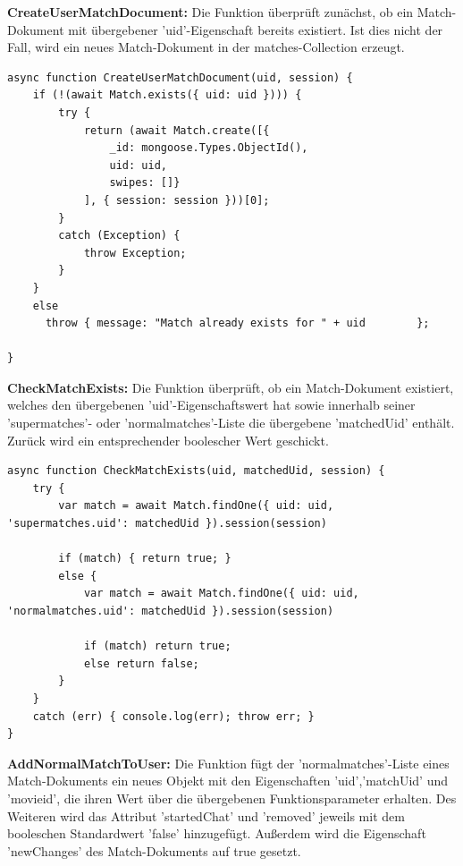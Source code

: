 \noindent
\textbf{CreateUserMatchDocument:}
Die Funktion überprüft zunächst, ob ein Match-Dokument mit übergebener 'uid'-Eigenschaft bereits existiert. Ist dies nicht der Fall, wird ein neues Match-Dokument in der matches-Collection erzeugt.\\

\begin{lstlisting}[caption=Match Service - CreateUserMatchDocument, label=lst:matchserviceCreateUserMatchDocument]
async function CreateUserMatchDocument(uid, session) {
    if (!(await Match.exists({ uid: uid }))) {
        try {
            return (await Match.create([{
                _id: mongoose.Types.ObjectId(),
                uid: uid,
                swipes: []}
            ], { session: session }))[0];
        }
        catch (Exception) {
            throw Exception;
        }
    }
    else 
      throw { message: "Match already exists for " + uid 		};
    
}
\end{lstlisting}

\noindent
\textbf{CheckMatchExists:}
Die Funktion überprüft, ob ein Match-Dokument existiert, welches den übergebenen 'uid'-Eigenschaftswert hat sowie innerhalb seiner 'supermatches'- oder 'normalmatches'-Liste die übergebene 'matchedUid' enthält. Zurück wird ein entsprechender boolescher Wert geschickt. 

\begin{lstlisting}[caption=Match Service - CreateUserMatchDocument, label=lst:matchserviceCreateUserMatchDocument]
async function CheckMatchExists(uid, matchedUid, session) {
    try {
        var match = await Match.findOne({ uid: uid, 'supermatches.uid': matchedUid }).session(session)

        if (match) { return true; }
        else {
            var match = await Match.findOne({ uid: uid, 'normalmatches.uid': matchedUid }).session(session)

            if (match) return true;
            else return false;
        }
    }
    catch (err) { console.log(err); throw err; }
}
\end{lstlisting}

\noindent
\textbf{AddNormalMatchToUser:}
Die Funktion fügt der 'normalmatches'-Liste eines Match-Dokuments ein neues Objekt mit den Eigenschaften 'uid','matchUid' und 'movieid', die ihren Wert über die übergebenen Funktionsparameter erhalten. Des Weiteren wird das Attribut 'startedChat' und 'removed' jeweils mit dem booleschen Standardwert 'false' hinzugefügt. Außerdem wird die Eigenschaft 'newChanges' des Match-Dokuments auf true gesetzt.

